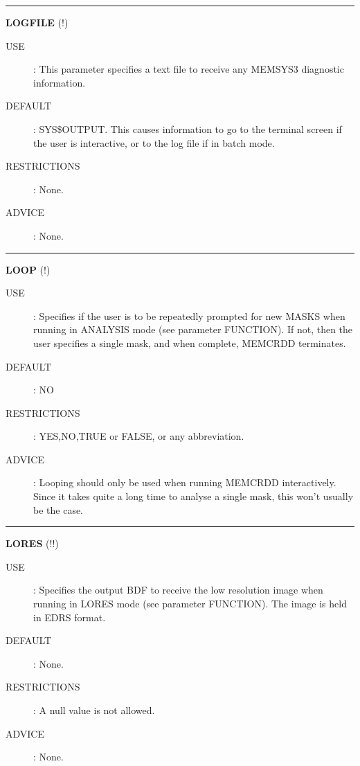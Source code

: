 \rule{\textwidth}{0.3mm}
{\Large {\bf LOGFILE} (!)}
\begin{description}
\item [USE]:
This parameter specifies a text file to receive any MEMSYS3 diagnostic
information.
\item [DEFAULT]:
SYS\$OUTPUT. This causes information to go to the terminal screen if the user
is interactive, or to the log file if in batch mode.
\item [RESTRICTIONS]:
None.
\item [ADVICE]:
None.
\end {description}

\rule{\textwidth}{0.3mm}
{\Large {\bf LOOP} (!)}
\begin{description}
\item [USE]:
Specifies if the user is to be repeatedly prompted for new MASKS when running in
ANALYSIS mode (see parameter FUNCTION). If not, then the user specifies a single
mask, and when complete, MEMCRDD terminates.
\item [DEFAULT]:
NO
\item [RESTRICTIONS]:
YES,NO,TRUE or FALSE, or any abbreviation.
\item [ADVICE]:
Looping should only be used when running MEMCRDD interactively. Since it
takes quite a long time to analyse a single mask, this won't usually be the case.
\end {description}

\rule{\textwidth}{0.3mm}
{\Large {\bf LORES} (!!)}
\begin{description}
\item [USE]:
Specifies the output BDF to receive the low resolution image when running in
LORES mode (see parameter FUNCTION). The image is held in EDRS format.
\item [DEFAULT]:
None.
\item [RESTRICTIONS]:
A null value is not allowed.
\item [ADVICE]:
None.
\end {description}

